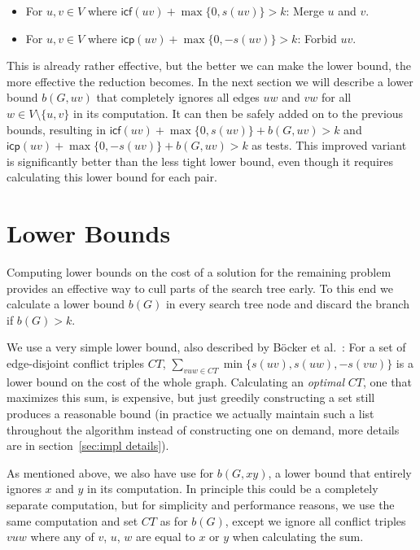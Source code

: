 \documentclass[12pt,oneside,english,parskip=full,headings=small]{scrbook}
\theoremstyle{definition}
\begin{document}
\begin{itemize}
	\item For $u, v \in V$ where $\mathsf{icf}(uv) + \max\{0, s(uv)\} > k$: Merge $u$ and $v$.
	\item For $u, v \in V$ where $\mathsf{icp}(uv) + \max\{0, -s(uv)\} > k$: Forbid $uv$.
\end{itemize}

This is already rather effective, but the better we can make the lower bound, the more effective the
reduction becomes. In the next section we will describe a lower bound $b(G, uv)$ that completely
ignores all edges $uw$ and $vw$ for all $w \in V \setminus \{u, v\}$ in its computation. It can then
be safely added on to the previous bounds, resulting in $\mathsf{icf}(uv) + \max\{0, s(uv)\} + b(G,
uv) > k$ and $\mathsf{icp}(uv) + \max\{0, -s(uv)\} + b(G, uv) > k$ as tests. This improved variant
is significantly better than the less tight lower bound, even though it requires calculating this
lower bound for each pair.

\section{Lower Bounds}

Computing lower bounds on the cost of a solution for the remaining problem provides an effective way
to cull parts of the search tree early. To this end we calculate a lower bound $b(G)$ in every
search tree node and discard the branch if $b(G) > k$.

We use a very simple lower bound, also described by Böcker et al.~\cite{ExactAlgos}: For a set of
edge-disjoint conflict triples $CT$, $\sum_{vuw \in CT} \min\{s(uv), s(uw), -s(vw)\}$ is a lower
bound on the cost of the whole graph. Calculating an \emph{optimal} $CT$, one that maximizes this
sum, is expensive, but just greedily constructing a set still produces a reasonable bound (in
practice we actually maintain such a list throughout the algorithm instead of constructing one on
demand, more details are in section~\ref{sec:impl details}).

As mentioned above, we also have use for $b(G, xy)$, a lower bound that entirely ignores $x$ and $y$
in its computation. In principle this could be a completely separate computation, but for simplicity
and performance reasons, we use the same computation and set $CT$ as for $b(G)$, except we ignore
all conflict triples $vuw$ where any of $v$, $u$, $w$ are equal to $x$ or $y$ when calculating the
sum.
\end{document}
